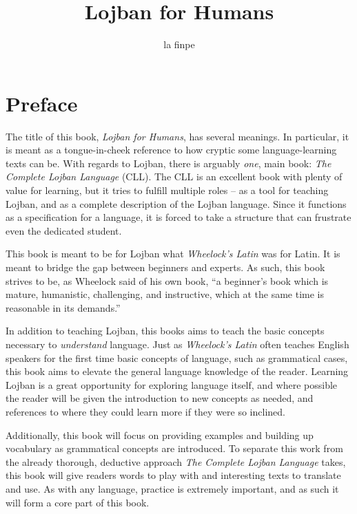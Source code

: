 \documentclass[12pt]{book}
\begin{document}
\title{Lojban for Humans}

\author{la finpe}


\maketitle

\chapter*{Preface}

The title of this book, \emph{Lojban for Humans}, has several meanings. In particular, it is meant as a tongue-in-cheek reference to how cryptic some language-learning texts can be. With regards to Lojban, there is arguably \emph{one}, main book: \textit{The Complete Lojban Language} (CLL). \cite{CLL} The CLL is an excellent book with plenty of value for learning, but it tries to fulfill multiple roles -- as a tool for teaching Lojban, and as a complete description of the Lojban language. Since it functions as a specification for a language, it is forced to take a structure that can frustrate even the dedicated student.

This book is meant to be for Lojban what \textit{Wheelock's Latin} \cite{WheelocksLatin} was for Latin. It is meant to bridge the gap between beginners and experts. As such, this book strives to be, as Wheelock said of his own book, ``a beginner's book which is mature, humanistic, challenging, and instructive, which at the same time is reasonable in its demands.'' \cite[Preface, p.~xiii]{WheelocksLatin}

In addition to teaching Lojban, this books aims to teach the basic concepts necessary to \emph{understand} language. Just as \textit{Wheelock's Latin} often teaches English speakers for the first time basic concepts of language, such as grammatical cases, this book aims to elevate the general language knowledge of the reader. Learning Lojban is a great opportunity for exploring language itself, and where possible the reader will be given the introduction to new concepts as needed, and references to where they could learn more if they were so inclined.  

Additionally, this book will focus on providing examples and building up vocabulary as grammatical concepts are introduced. To separate this work from the already thorough, deductive approach \textit{The Complete Lojban Language} takes, this book will give readers words to play with and interesting texts to translate and use. As with any language, practice is extremely important, and as such it will form a core part of this book.  
\end{document}

